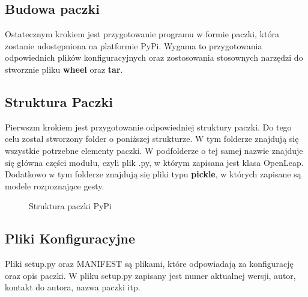     \subsection{Budowa paczki}
    
    \quad Ostatecznym krokiem jest przygotowanie programu w formie paczki, która zostanie udostępniona na platformie PyPi. Wygama to przygotowania odpowiednich plików konfiguracyjnych oraz zostosowania stosownych narzędzi do stworznie pliku \textbf{wheel} oraz \textbf{tar}. 
    
    \subsection{Struktura Paczki}
    \quad Pierwszm krokiem jest przygotowanie odpowiedniej struktury paczki. Do tego celu został stworzony folder o poniższej strukturze. W tym folderze znajdują się wszystkie potrzebne elementy paczki. W podfolderze o tej samej nazwie znajduje się główna części modułu, czyli plik .py, w którym zapisana jest klasa OpenLeap. Dodatkowo w tym folderze znajdują się pliki typu \textbf{pickle}, w których zapisane są modele rozpoznające gesty.
    
    \begin{figure}
    \centering
        \begin{minipage}{7cm}
        \end{minipage}
        \caption{Struktura paczki PyPi}
    \end{figure}
    
    \subsection{Pliki Konfiguracyjne}
    \quad Pliki setup.py oraz MANIFEST są plikami, które odpowiadają za konfigurację oraz opis paczki. W pliku setup.py zapisany jest numer aktualnej wersji, autor, kontakt do autora, nazwa paczki itp. 
    
    \quad 
    
    

